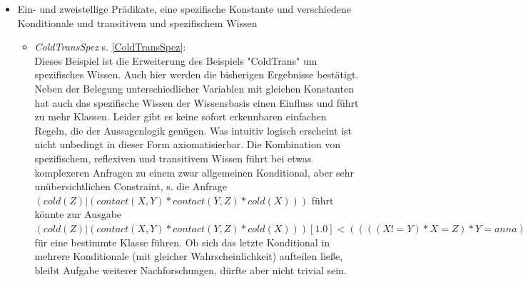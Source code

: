 \documentclass[a4paper, 11pt]{book}
\begin{document}
\begin{itemize}
\begin{itemize}
 Man betrachte das unbedingte Konditional $\langle (cold(X) \mid ((contact(X,Y)  \land contact(Y,Z)) \land cold(Z)),  X = Z \rangle$ . Sei cold(Z) (als Teil der Prämisse) wahr. Dann ist $ cold(X) $ (also die Konklusion) auch wahr für X = Z, was nicht weiter überraschend ist, aber an dieser Stelle für erwähnenswert gehalten wurde, da es durchaus für den Entwurf eines regelbasierten Algorithmus relevant sein könnte. Das bedingte Konditional sollte damit wie folgt aussehen: $\langle (cold(X) \mid ((contact(X,Y)  \land contact(Y,Z)) \land cold(Z)) [1.00000],  X = Z \rangle$.\\ Im Ergebnis bleibt zu sagen, dass auch Transitivität zu keinen überraschenden Ergebnissen führt. Lediglich die Belegung unterschiedlicher Variablen mit gleichen Konstanten hat einen erheblichen Einfluss. Ebenso die Gestalt bzw. das Wissen der Anfrage.
\end{itemize}


\item{Ein- und zweistellige Prädikate, eine spezifische Konstante und verschiedene Konditionale und transitivem und spezifischem Wissen}
\begin{itemize}
\item \textsl{ColdTransSpez} \label{BColdTransSpez} s. \ref{ColdTransSpez}:\\
Dieses Beispiel ist die Erweiterung des Beispiels "{}ColdTrans"{} um spezifisches Wissen. Auch hier werden die bisherigen Ergebnisse bestätigt. Neben der Belegung unterschiedlicher Variablen mit gleichen Konstanten hat auch das spezifische Wissen der Wissensbasis einen Einfluss und führt zu mehr Klassen. Leider gibt es keine sofort erkennbaren einfachen Regeln, die der Aussagenlogik genügen. Was intuitiv logisch erscheint ist nicht unbedingt in dieser Form axiomatisierbar. Die Kombination von spezifischem, reflexiven und transitivem Wissen führt bei etwas komplexeren Anfragen zu einem zwar allgemeinen Konditional, aber sehr unübersichtlichen Constraint, s. die Anfrage $ (cold(Z)|(contact(X,Y) * contact(Y,Z) * cold(X))) $ führt könnte zur Ausgabe $ (cold(Z)|(contact(X,Y) * contact(Y,Z) * cold(X)))[1.0]<((((X != Y) * X = Z) * Y = anna) + ( X = Y * X = Z)) + (X = Z * Z = anna) * X != Y)) + (( X != anna * Y != anna * Z != anna))> $ für eine bestimmte Klasse führen. Ob sich das letzte Konditional in mehrere Konditionale (mit gleicher Wahrscheinlichkeit) aufteilen ließe, bleibt Aufgabe weiterer Nachforschungen, dürfte aber nicht trivial sein. 
\end{itemize}

\end{itemize}
\end{document}
